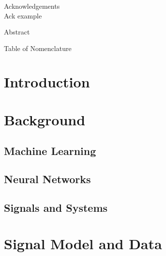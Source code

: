 \documentclass[12pt]{article}
\begin{document}
\newpage
{}
\setcounter{page}{1}

\newpage

\begin{center}
{\Large Acknowledgements} \\

\vspace{1in}
Ack example
\end{center}

\newpage

\begin{center}
{\Large Abstract} \\

\vspace{1in}

\end{center}


\newpage

\tableofcontents

\newpage

\listoffigures

\newpage

Table of Nomenclature

\clearpage
\setcounter{page}{1}

\fontsize{12pt}{24pt}\selectfont
\section{Introduction}

\newpage

\section{Background}
\subsection{Machine Learning}

\subsection{Neural Networks}

\subsection{Signals and Systems}

\newpage

\section{Signal Model and Data}
\newpage
\end{document}
